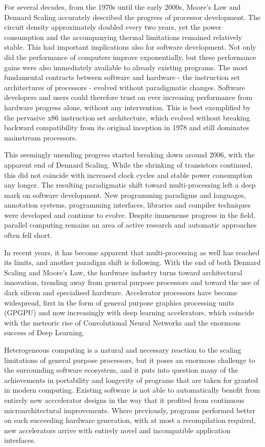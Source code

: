     For several decades, from the 1970s until the early 2000s, Moore's Law and
    Dennard Scaling accurately described the progress of processor development.
    The circuit density approximately doubled every two years, yet the power
    consumption and the accompanying thermal limitations remained relatively
    stable.
    This had important implications also for software development.
    Not only did the performance of computers improve exponentially, but these
    performance gains were also immediately available to already existing
    programs.
    The most fundamental contracts between software and hardware - the
    instruction set architectures of processors - evolved without paradigmatic
    changes.
    Software developers and users could therefore trust on ever increasing
    performance from hardware progress alone, without any intervention.
    This is best exemplified by the pervasive x86 instruction set architecture,
    which evolved without breaking backward compatibility from its original
    inception in 1978 and still dominates mainstream processors.

    This seemingly unending progress started breaking down around 2006,
    with the apparent end of Dennard Scaling.
    While the shrinking of transistors continued, this did not coincide with
    increased clock cycles and stable power consumption any longer.
    The resulting paradigmatic shift toward multi-processing left a deep mark on
    software development.
    New programming paradigms and languages, annotation systems, programming
    interfaces, libraries and compiler techniques were developed and continue to
    evolve.
    Despite immenense progress in the field, parallel computing remains an area
    of active research and automatic approaches often fell short.

    In recent years, it has become apparent that multi-processing as well has
    reached its limits, and another paradigm shift is following.
    With the end of both Dennard Scaling and Moore's Law, the hardware industry
    turns toward architectural innovation, trending away from general purpose
    processors and toward the use of dark silicon and specialised hardware.
    Accelerator processors have become widespread, first in the form of general
    purpose graphics processing units (GPGPU) and now increasingly with deep
    learning accelerators, which coincide with the meteoric rise of
    Convolutional Neural Networks and the enormous success of Deep Learning.

    Heterogeneous computing is a natural and necessary reaction to the scaling
    limitations of general purpose processors, but it poses an enormous
    challenge to the surrounding software ecosystem, and it puts into question
    many of the achievements in portability and longevity of programs that are
    taken for granted in modern computing.
    Existing software is not able to automatically benefit from entirely new
    acccelerator designs in the way that it profited from continuous
    microarchitectural improvements.
    Where previously, programs performed better on each succeeding hardware
    generation, with at most a recompilation required, new accelerators arrive
    with entirely novel and incompatible application interfaces.

